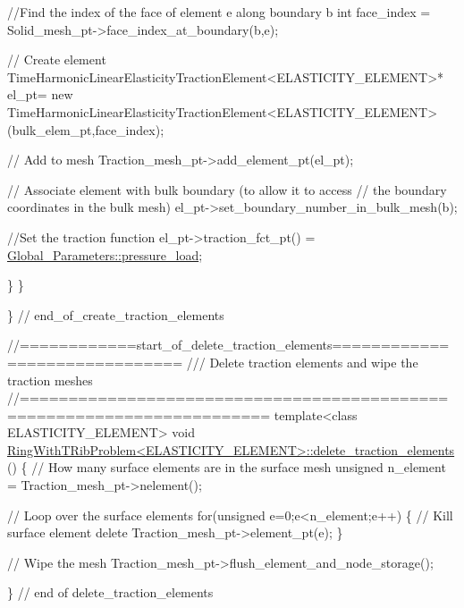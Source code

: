 \begin{DoxyCodeInclude}
    \textcolor{comment}{//Find the index of the face of element e along boundary b}
    \textcolor{keywordtype}{int} face\_index = Solid\_mesh\_pt->face\_index\_at\_boundary(b,e);
    
    \textcolor{comment}{// Create element}
    TimeHarmonicLinearElasticityTractionElement<ELASTICITY\_ELEMENT>* el\_pt=
     \textcolor{keyword}{new} TimeHarmonicLinearElasticityTractionElement<ELASTICITY\_ELEMENT>
     (bulk\_elem\_pt,face\_index);   
    
    \textcolor{comment}{// Add to mesh}
    Traction\_mesh\_pt->add\_element\_pt(el\_pt);
    
    \textcolor{comment}{// Associate element with bulk boundary (to allow it to access}
    \textcolor{comment}{// the boundary coordinates in the bulk mesh)}
    el\_pt->set\_boundary\_number\_in\_bulk\_mesh(b); 
    
    \textcolor{comment}{//Set the traction function}
    el\_pt->traction\_fct\_pt() = \hyperlink{namespaceGlobal__Parameters_a0ddb3a77481b907fbb34f2e8d0a6eb9f}{Global\_Parameters::pressure\_load};
    
   \}
 \}
 
\} \textcolor{comment}{// end\_of\_create\_traction\_elements}




\textcolor{comment}{//============start\_of\_delete\_traction\_elements==============================}\textcolor{comment}{}
\textcolor{comment}{/// Delete traction elements and wipe the  traction meshes}
\textcolor{comment}{}\textcolor{comment}{//=======================================================================}
\textcolor{keyword}{template}<\textcolor{keyword}{class} ELASTICITY\_ELEMENT>
\textcolor{keywordtype}{void} \hyperlink{classRingWithTRibProblem_aa85169a96623cb39f18111ee436f5b9d}{RingWithTRibProblem<ELASTICITY\_ELEMENT>::delete\_traction\_elements}
      ()
\{
 \textcolor{comment}{// How many surface elements are in the surface mesh}
 \textcolor{keywordtype}{unsigned} n\_element = Traction\_mesh\_pt->nelement();
 
 \textcolor{comment}{// Loop over the surface elements}
 \textcolor{keywordflow}{for}(\textcolor{keywordtype}{unsigned} e=0;e<n\_element;e++)
  \{
   \textcolor{comment}{// Kill surface element}
   \textcolor{keyword}{delete} Traction\_mesh\_pt->element\_pt(e);
  \}
 
 \textcolor{comment}{// Wipe the mesh}
 Traction\_mesh\_pt->flush\_element\_and\_node\_storage();

\} \textcolor{comment}{// end of delete\_traction\_elements}






\end{DoxyCodeInclude}

